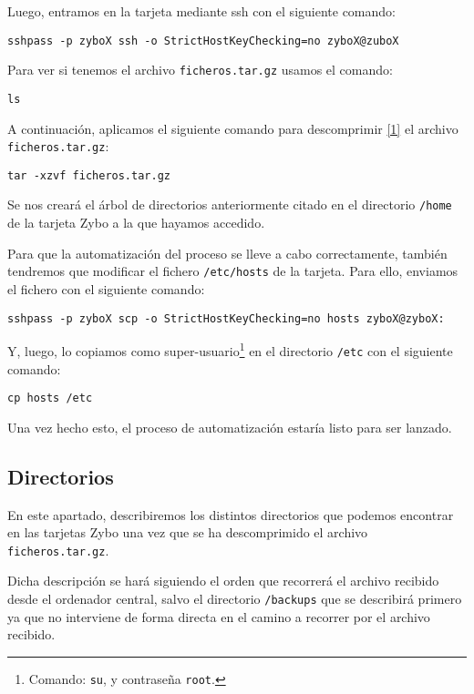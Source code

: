 Luego, entramos en la tarjeta mediante ssh con el siguiente comando:
\begin{center}
	\texttt{sshpass -p zyboX ssh -o StrictHostKeyChecking=no zyboX@zuboX}
\end{center}

Para ver si tenemos el archivo \texttt{ficheros.tar.gz} usamos el comando:
\begin{center}
	\texttt{ls}
\end{center}

A continuación, aplicamos el siguiente comando para descomprimir \hyperlink{1}{[1]} el archivo \texttt{ficheros.tar.gz}:
\begin{center}
	\texttt{tar -xzvf ficheros.tar.gz}
\end{center}

Se nos creará el árbol de directorios anteriormente citado en el directorio \texttt{/home} de la tarjeta Zybo a la que hayamos accedido.

Para que la automatización del proceso se lleve a cabo correctamente, también tendremos que modificar el fichero \texttt{/etc/hosts} de la tarjeta. Para ello, enviamos el fichero con el siguiente comando:
\begin{center}
	\texttt{sshpass -p zyboX scp -o StrictHostKeyChecking=no hosts zyboX@zyboX:}
\end{center}

Y, luego, lo copiamos como super-usuario\footnote{Comando: \texttt{su}, y contraseña \texttt{root}.} en el directorio \texttt{/etc} con el siguiente comando:
\begin{center}
	\texttt{cp hosts /etc}
\end{center}

Una vez hecho esto, el proceso de automatización estaría listo para ser lanzado.

\subsection{Directorios}
En este apartado, describiremos los distintos directorios que podemos encontrar en las tarjetas Zybo una vez que se ha descomprimido el archivo \texttt{ficheros.tar.gz}.

Dicha descripción se hará siguiendo el orden que recorrerá el archivo recibido desde el ordenador central, salvo el directorio \texttt{/backups} que se describirá primero ya que no interviene de forma directa en el camino a recorrer por el archivo recibido.

